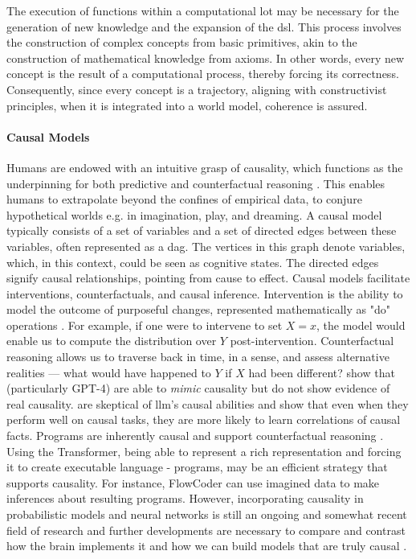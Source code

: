The execution of functions within a computational \acrshort{lot} may be necessary for the generation of new knowledge and the expansion of the \acrshort{dsl}. This process involves the construction of complex concepts from basic primitives, akin to the construction of mathematical knowledge from axioms. In other words, every new concept is the result of a computational process, thereby forcing its correctness. Consequently, since every concept is a trajectory, aligning with constructivist principles, when it is integrated into a world model, coherence is assured.

\paragraph*{Causal Models}
Humans are endowed with an intuitive grasp of causality, which functions as the underpinning for both predictive and counterfactual reasoning \cite{lakeBuildingMachinesThat2017}. This enables humans to extrapolate beyond the confines of empirical data, to conjure hypothetical worlds e.g. in imagination, play, and dreaming.
A causal model typically consists of a set of variables and a set of directed edges between these variables, often represented as a \acrshort{dag}. The vertices in this graph denote variables, which, in this context, could be seen as cognitive states. The directed edges signify causal relationships, pointing from cause to effect.
Causal models facilitate interventions, counterfactuals, and causal inference. Intervention is the ability to model the outcome of purposeful changes, represented mathematically as "do" operations  \cite{pearlTheoreticalImpedimentsMachine2018}. For example, if one were to intervene to set $X = x$, the model would enable us to compute the distribution over $Y$ post-intervention.
Counterfactual reasoning allows us to traverse back in time, in a sense, and assess alternative realities — what would have happened to $Y$ if $X$ had been different?
\citet{kicimanCausalReasoningLarge2023} show that  (particularly GPT-4) are able to \emph{mimic} causality but do not show evidence of real causality. \citet{zecevicCausalParrotsLarge2023} are skeptical of \acrshort{llm}'s causal abilities and show that even when they perform well on causal tasks, they are more likely to learn correlations of causal facts.
Programs are inherently causal and support counterfactual reasoning \cite{chaterProgramsCausalModels2013}. Using the Transformer, being able to represent a rich representation and forcing it to create executable language - programs, may be an efficient strategy that supports causality. For instance, FlowCoder can use imagined data to make inferences about resulting programs.
However, incorporating causality in probabilistic models and neural networks is still an ongoing and somewhat recent field of research and further developments are necessary to compare and contrast how the brain implements it and how we can build models that are truly causal \cite{scholkopfCausalRepresentationLearning2021}.




